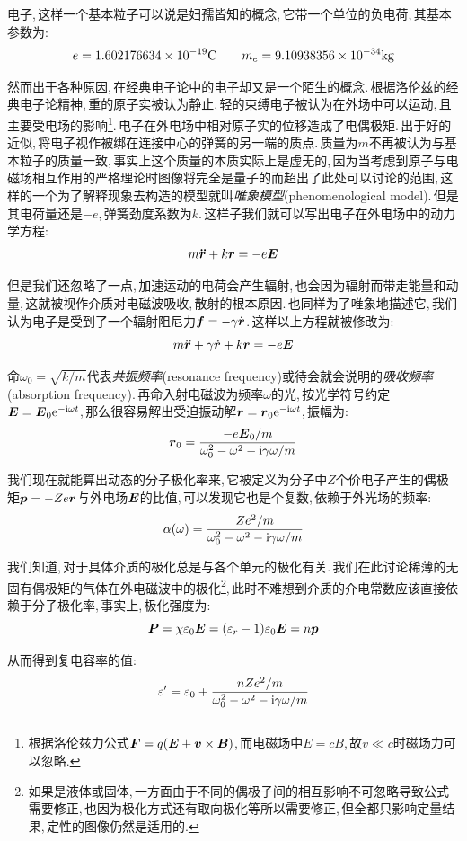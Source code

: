 电子,\,这样一个基本粒子可以说是妇孺皆知的概念,\,它带一个单位的负电荷,\,其基本参数为:
\[e=1.602176634\times 10^{-19}{\rm C}\qquad m_e=9.10938356\times 10^{-34}{\rm kg}\]

然而出于各种原因,\,在经典电子论中的电子却又是一个陌生的概念.\,根据洛伦兹的经典电子论精神,\,重的原子实被认为静止,\,轻的束缚电子被认为在外场中可以运动,\,且主要受电场的影响\footnote{根据洛伦兹力公式$\boldsymbol{F}=q(\boldsymbol{E}+\boldsymbol{v}\times\boldsymbol{B})$,\,而电磁场中$E=cB$,\,故$v\ll c$时磁场力可以忽略.}.\,电子在外电场中相对原子实的位移造成了电偶极矩.\,出于好的近似,\,将电子视作被绑在连接中心的弹簧的另一端的质点.\,质量为$m$不再被认为与基本粒子的质量一致,\,事实上这个质量的本质实际上是虚无的,\,因为当考虑到原子与电磁场相互作用的严格理论时图像将完全是量子的而超出了此处可以讨论的范围,\,这样的一个为了解释现象去构造的模型就叫\emph{唯象模型}(phenomenological model).\,但是其电荷量还是$-e$,\,弹簧劲度系数为$k$.\,这样子我们就可以写出电子在外电场中的动力学方程:
\[m\boldsymbol{\ddot{r}}+k\boldsymbol{r}=-e\boldsymbol{E}\]

但是我们还忽略了一点,\,加速运动的电荷会产生辐射,\,也会因为辐射而带走能量和动量,\,这就被视作介质对电磁波吸收,\,散射的根本原因.\,也同样为了唯象地描述它,\,我们认为电子是受到了一个辐射阻尼力$\boldsymbol{f}=-\gamma \dot{\boldsymbol{r}}$.\,这样以上方程就被修改为:
\[m\boldsymbol{\ddot{r}}+\gamma \boldsymbol{\dot{r}}+k\boldsymbol{r}=-e\boldsymbol{E}\]

命$\omega_0=\sqrt{k/m}$代表\emph{共振频率}(resonance frequency)或待会就会说明的\emph{吸收频率}(absorption frequency).\,再命入射电磁波为频率$\omega$的光,\,按光学符号约定$\boldsymbol{E}=\boldsymbol{E}_0{\rm e}^{-{\rm i}\omega t}$,\,那么很容易解出受迫振动解$\boldsymbol{r}=\boldsymbol{r}_0{\rm e}^{-{\rm i}\omega t}$,\,振幅为:
\[\boldsymbol{r}_0=\frac{-e\boldsymbol{E}_0/m}{\omega_0^2-\omega^2-{\rm i}\gamma\omega/m}\]

我们现在就能算出动态的分子极化率来,\,它被定义为分子中$Z$个价电子产生的偶极矩$\boldsymbol{p}=-Ze\boldsymbol{r}$与外电场$\boldsymbol{E}$的比值,\,可以发现它也是个复数,\,依赖于外光场的频率:
\[\alpha(\omega)=\frac{Ze^2/m}{\omega_0^2-\omega^2-{\rm i}\gamma\omega/m}\]

我们知道,\,对于具体介质的极化总是与各个单元的极化有关.\,我们在此讨论稀薄的无固有偶极矩的气体在外电磁波中的极化\footnote{如果是液体或固体,\,一方面由于不同的偶极子间的相互影响不可忽略导致公式需要修正,\,也因为极化方式还有取向极化等所以需要修正,\,但全都只影响定量结果,\,定性的图像仍然是适用的.},\,此时不难想到介质的介电常数应该直接依赖于分子极化率,\,事实上,\,极化强度为:
\[\boldsymbol{P}=\chi\varepsilon_0\boldsymbol{E}=(\varepsilon_r-1)\varepsilon_0\boldsymbol{E}=n\boldsymbol{p}\]


从而得到复电容率的值:
\[\varepsilon'=\varepsilon_0+\frac{nZe^2/m}{\omega_0^2-\omega^2-{\rm i}\gamma\omega/m}\]


